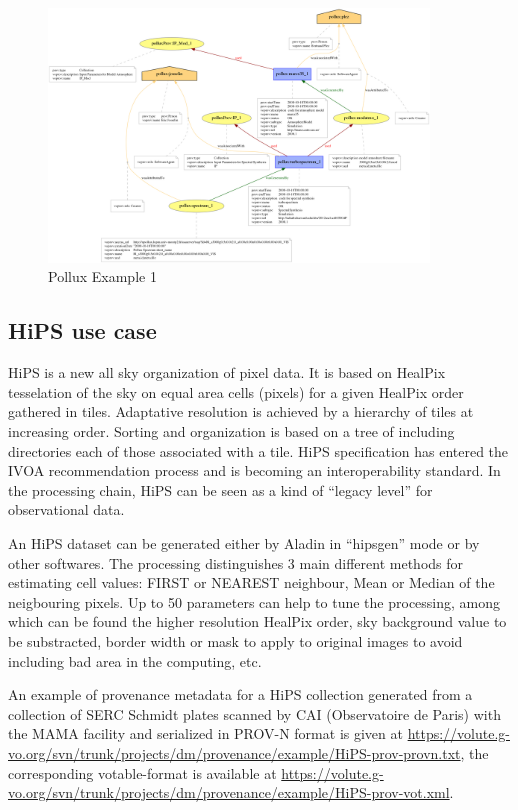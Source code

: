 \begin{figure}
\centering
\includegraphics[width=0.9\textwidth]{usecase_Pollux_example1.png}
\caption{Pollux Example 1}
\label{fig:pollux}
\end{figure}

\subsection{HiPS use case}
HiPS is a new all sky organization of pixel data. It is based on HealPix tesselation of the sky on equal area cells (pixels) for a given HealPix order gathered in tiles. Adaptative resolution is achieved by a hierarchy of tiles at increasing order. Sorting and organization is based on a tree of including directories each of those associated with a tile. HiPS specification has entered the IVOA recommendation process and is becoming an interoperability standard.
In the processing chain, HiPS can be seen as a kind of ``legacy level'' for observational data.

An HiPS dataset can be generated either by Aladin in ``hipsgen'' mode or by other softwares.  The processing distinguishes 3 main different methods for estimating cell values: FIRST or NEAREST neighbour, Mean or Median of the neigbouring pixels. Up to 50 parameters can help to tune the processing, among which can be found the higher resolution HealPix order, sky background value to be substracted, border width or mask to apply to original images to avoid including bad area in the computing, etc.

An example of provenance metadata for a HiPS collection generated from a collection of SERC Schmidt plates scanned by CAI (Observatoire de Paris) with the MAMA facility and serialized in PROV-N format is given at 
\url{https://volute.g-vo.org/svn/trunk/projects/dm/provenance/example/HiPS-prov-provn.txt}, the corresponding votable-format is available at \url{https://volute.g-vo.org/svn/trunk/projects/dm/provenance/example/HiPS-prov-vot.xml}.

